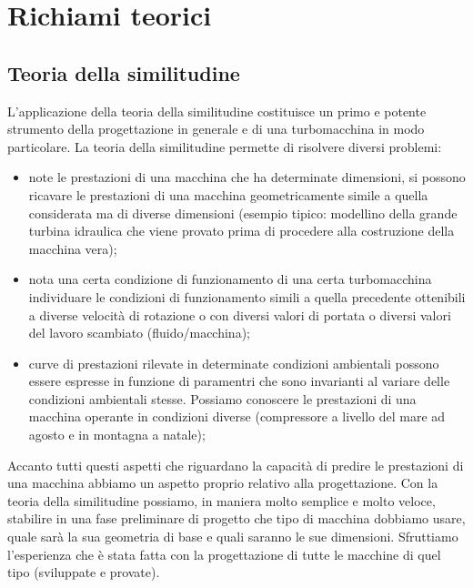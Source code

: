 \chapter{Richiami teorici}
\section{Teoria della similitudine}
L’applicazione della teoria della similitudine costituisce un primo e potente strumento della progettazione in generale e di una turbomacchina in modo particolare. La teoria della similitudine permette di risolvere diversi problemi:
\begin{itemize}
\item note le prestazioni di una macchina che ha determinate dimensioni,
si possono ricavare le prestazioni di una macchina geometricamente simile a quella considerata ma di diverse dimensioni (esempio tipico: modellino della grande turbina idraulica che viene provato prima di procedere alla costruzione della macchina vera);
\item nota una certa condizione di funzionamento di una certa turbomacchina
individuare le condizioni di funzionamento simili a quella precedente
ottenibili a diverse velocità di rotazione o con diversi valori di portata o
diversi valori del lavoro scambiato (fluido/macchina);
\item curve di prestazioni rilevate in determinate condizioni ambientali possono essere espresse in funzione di paramentri che sono invarianti al variare delle condizioni ambientali stesse. Possiamo conoscere le prestazioni di una macchina operante in condizioni diverse (compressore a livello del mare ad agosto e in montagna a natale);
\end{itemize}
Accanto tutti questi aspetti che riguardano la capacità di predire le prestazioni di una macchina abbiamo un aspetto proprio relativo alla progettazione. Con la teoria della similitudine possiamo, in maniera molto semplice e molto veloce, stabilire in una fase preliminare di progetto che tipo di macchina dobbiamo usare, quale sarà la sua geometria di base e quali
saranno le sue dimensioni. Sfruttiamo l’esperienza che è stata fatta con
la progettazione di tutte le macchine di quel tipo (sviluppate e provate).


